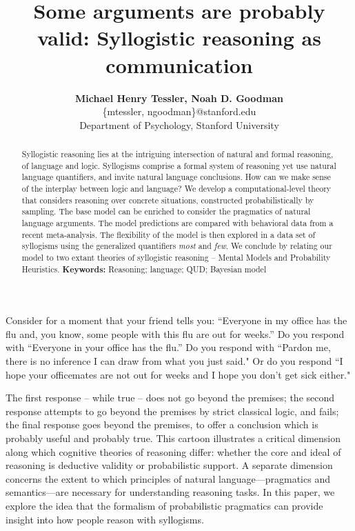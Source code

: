 \documentclass[10pt,letterpaper]{article}
\begin{document}
\title{Some arguments are probably valid: Syllogistic reasoning as communication}
 
\author{{\large \bf Michael Henry Tessler, Noah D. Goodman } \\
	\{mtessler, ngoodman\}@stanford.edu \\
  Department of Psychology, Stanford University}

\maketitle


\begin{abstract}
Syllogistic reasoning lies at the intriguing intersection of natural and formal reasoning, of language and logic. Syllogisms comprise a formal system of reasoning yet use natural language quantifiers, and invite natural language conclusions. How can we make sense of the interplay between logic and language? We develop a computational-level theory that considers reasoning over concrete situations, constructed probabilistically by sampling. The base model can be enriched to consider the pragmatics of natural language arguments. The model predictions are compared with behavioral data from a recent meta-analysis. The flexibility of the model is then explored in a data set of syllogisms using the generalized quantifiers \emph{most} and \emph{few}. We conclude by relating our model to two extant theories of syllogistic reasoning -- Mental Models and Probability Heuristics. \textbf{Keywords:} 
Reasoning; language; QUD; Bayesian model
\end{abstract}


Consider for a moment that your friend tells you:
``Everyone in my office has the flu and, you know, some people with this flu are out for weeks.''
Do you respond with
``Everyone in your office has the flu.''
Do you respond with
``Pardon me, there is no inference I can draw from what you just said."
Or do you respond
 ``I hope your officemates are not out for weeks and I hope you don't get sick either."
 
 
 The first response -- while true -- does not go beyond the premises; the second response attempts to go beyond the premises by strict classical logic, and fails; the final response goes beyond the premises, to offer a conclusion which is probably useful and probably true.
% 
This cartoon illustrates a critical dimension along which cognitive theories of reasoning differ: whether the core and ideal of reasoning is deductive validity or probabilistic support. A separate dimension concerns the extent to which principles of natural language---pragmatics and semantics---are necessary for understanding reasoning tasks. In this paper, we explore the idea that the formalism of probabilistic pragmatics can provide insight into how people reason with syllogisms. 
\end{document}
